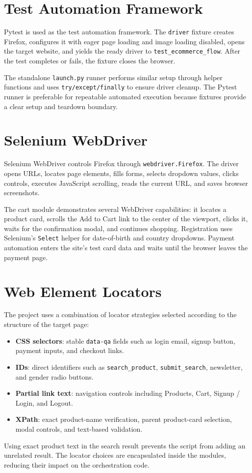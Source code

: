 \documentclass[12pt,a4paper]{article}
\begin{document}
\section{Test Automation Framework}
Pytest is used as the test automation framework. The \texttt{driver} fixture creates Firefox, configures it with eager page loading and image loading disabled, opens the target website, and yields the ready driver to \texttt{test\_ecommerce\_flow}. After the test completes or fails, the fixture closes the browser.

The standalone \texttt{launch.py} runner performs similar setup through helper functions and uses \texttt{try/except/finally} to ensure driver cleanup. The Pytest runner is preferable for repeatable automated execution because fixtures provide a clear setup and teardown boundary.

\section{Selenium WebDriver}
Selenium WebDriver controls Firefox through \texttt{webdriver.Firefox}. The driver opens URLs, locates page elements, fills forms, selects dropdown values, clicks controls, executes JavaScript scrolling, reads the current URL, and saves browser screenshots.

The cart module demonstrates several WebDriver capabilities: it locates a product card, scrolls the Add to Cart link to the center of the viewport, clicks it, waits for the confirmation modal, and continues shopping. Registration uses Selenium's \texttt{Select} helper for date-of-birth and country dropdowns. Payment automation enters the site's test card data and waits until the browser leaves the payment page.

\section{Web Element Locators}
The project uses a combination of locator strategies selected according to the structure of the target page:
\begin{itemize}[leftmargin=1.6em]
  \item \textbf{CSS selectors}: stable \texttt{data-qa} fields such as login email, signup button, payment inputs, and checkout links.
  \item \textbf{IDs}: direct identifiers such as \texttt{search\_product}, \texttt{submit\_search}, newsletter, and gender radio buttons.
  \item \textbf{Partial link text}: navigation controls including Products, Cart, Signup / Login, and Logout.
  \item \textbf{XPath}: exact product-name verification, parent product-card selection, modal controls, and text-based validation.
\end{itemize}
Using exact product text in the search result prevents the script from adding an unrelated result. The locator choices are encapsulated inside the modules, reducing their impact on the orchestration code.
\end{document}
